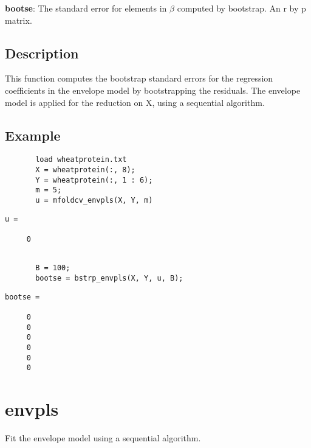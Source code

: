 \documentclass[a4paper,11pt,openany]{memoir}
\begin{document}
\begin{par}
\textbf{bootse}: The standard error for elements in $\beta$ computed by bootstrap.  An r by p matrix.
\end{par} \vspace{1em}


\subsection*{Description}

\begin{par}
This function computes the bootstrap standard errors for the regression coefficients in the envelope model by bootstrapping the residuals. The envelope model is applied for the reduction on X, using a sequential algorithm.
\end{par} \vspace{1em}


\subsection*{Example}


\begin{verbatim}       load wheatprotein.txt
       X = wheatprotein(:, 8);
       Y = wheatprotein(:, 1 : 6);
       m = 5;
       u = mfoldcv_envpls(X, Y, m)\end{verbatim}
               \color{lightgray} \ttfamily\begin{verbatim}
u =

     0

\end{verbatim} \rmfamily
\color{black}\begin{verbatim}
       
       B = 100;
       bootse = bstrp_envpls(X, Y, u, B);\end{verbatim}

        \color{lightgray}\ttfamily \begin{verbatim}
bootse =

     0
     0
     0
     0
     0
     0

\end{verbatim} \rmfamily    
\color{black}

\newpage

\rmfamily
\color{black}\section{envpls}

\begin{par}
Fit the envelope model using a sequential algorithm.
\end{par} \vspace{1em}
\end{document}
